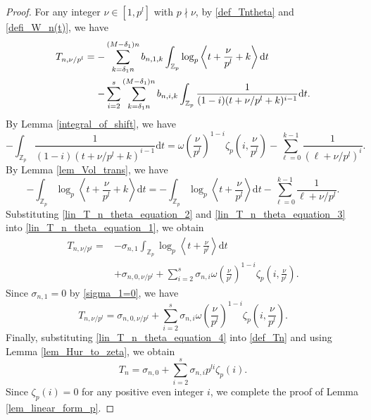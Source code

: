 \documentclass[12pt]{article}
\numberwithin{equation}{section}
\begin{document}
\begin{proof}
For any integer $\nu \in [1,p^l]$ with $p \nmid \nu$, by \eqref{def_Tntheta} and \eqref{defi_W_n(t)}, we have
\begin{align}
	T_{n,\nu/p^l} =  -& \sum_{k=\delta_1 n}^{(M-\delta_1)n} b_{n,1,k} \int_{\mathbb{Z}_p} \log_p\left\langle t+\frac{\nu}{p^l}+k \right\rangle \mathrm{d}t \notag\\
	-& \sum_{i=2}^{s} \sum_{k=\delta_1 n}^{(M-\delta_1)n} b_{n,i,k} \int_{\mathbb{Z}_p}\frac{1}{(1-i)(t+\nu/p^l+k)^{i-1}} \mathrm{d}t. \label{lin_T_n_theta_equation_1}
\end{align}
By Lemma \ref{integral_of_shift}, we have
\begin{equation}\label{lin_T_n_theta_equation_2}
	- \int_{\mathbb{Z}_p} \frac{1}{(1-i)(t+\nu/p^{l}+k)^{i-1}} \mathrm{d}t = \omega\left( \frac{\nu}{p^{l}} \right)^{1-i} \zeta_p\left(i, \frac{\nu}{p^l} \right)  - \sum_{\ell = 0}^{k-1} \frac{1}{(\ell+\nu/p^{l})^{i}}.
\end{equation}
By Lemma \ref{lem_Vol_trans}, we have
\begin{equation}\label{lin_T_n_theta_equation_3}
	-\int_{\mathbb{Z}_p} \log_p\left\langle t+\frac{\nu}{p^l}+k \right\rangle \mathrm{d}t = -\int_{\mathbb{Z}_p} \log_p\left\langle t+\frac{\nu}{p^l} \right\rangle \mathrm{d}t - \sum_{\ell=0}^{k-1} \frac{1}{\ell+\nu/p^l}.
\end{equation}
Substituting \eqref{lin_T_n_theta_equation_2} and \eqref{lin_T_n_theta_equation_3} into \eqref{lin_T_n_theta_equation_1}, we obtain
\begin{align*}
T_{n,\nu/p^l} = &-\sigma_{n,1} \int_{\mathbb{Z}_p} \log_p\left\langle t+\frac{\nu}{p^l} \right\rangle \mathrm{d}t \\
&+\sigma_{n,0,\nu/p^l} + \sum_{i=2}^{s} \sigma_{n,i} \omega\left( \frac{\nu}{p^{l}} \right)^{1-i} \zeta_p\left(i, \frac{\nu}{p^l} \right).
\end{align*}
Since $\sigma_{n,1} = 0$ by \eqref{sigma_1=0}, we have
\begin{equation}\label{lin_T_n_theta_equation_4}
T_{n,\nu/p^l} = \sigma_{n,0,\nu/p^l} + \sum_{i=2}^{s} \sigma_{n,i} \omega\left( \frac{\nu}{p^{l}} \right)^{1-i} \zeta_p\left(i, \frac{\nu}{p^l} \right).
\end{equation}
Finally, substituting \eqref{lin_T_n_theta_equation_4} into \eqref{def_Tn} and using Lemma \ref{lem_Hur_to_zeta}, we obtain
\begin{equation*}
T_n =  \sigma_{n,0} + \sum_{i=2}^{s} \sigma_{n,i} p^{li} \zeta_p(i).
\end{equation*}
Since $\zeta_p(i) =0 $ for any positive even integer $i$, we complete the proof of Lemma \ref{lem_linear_form_p}.
\end{proof}
\end{document}
